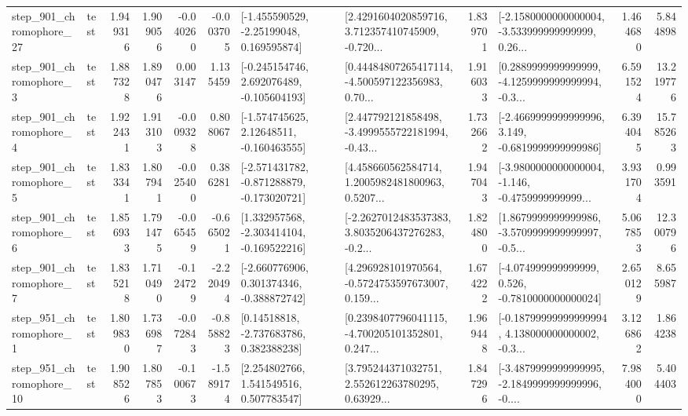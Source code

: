 \begin{tabular}{llrrrrllrlrr}
  step\_901\_chromophore\_27 &      test &      1.949316 &    1.909056 &     -0.040260 & -0.003705 &    [-1.455590529, -2.25199048, 0.169595874] &  [2.4291604020859716, 3.712357410745909, -0.720... &       1.839701 &  [-2.1580000000000004, -3.533999999999999, 0.26... &            1.464680 &          5.844898 \\
   step\_901\_chromophore\_3 &      test &      1.887328 &    1.890476 &      0.003147 &  1.135459 &   [-0.245154746, 2.692076489, -0.105604193] &  [0.44484807265417114, -4.500597122356983, 0.70... &       1.916033 &  [0.2889999999999999, -4.1259999999999994, -0.3... &            6.591524 &         13.219776 \\
   step\_901\_chromophore\_4 &      test &      1.922431 &    1.913103 &     -0.009328 &  0.808067 &    [-1.574745625, 2.12648511, -0.160463555] &  [2.447792121858498, -3.4999555722181994, -0.43... &       1.732662 &  [-2.4669999999999996, 3.149, -0.6819999999999986] &            6.394045 &         15.785263 \\
   step\_901\_chromophore\_5 &      test &      1.833341 &    1.807941 &     -0.025400 &  0.386281 &  [-2.571431782, -0.871288879, -0.173020721] &  [4.458660562584714, 1.2005982481800963, 0.5207... &       1.947043 &  [-3.9800000000000004, -1.146, -0.4759999999999... &            3.931704 &          0.993591 \\
   step\_901\_chromophore\_6 &      test &      1.856933 &    1.791475 &     -0.065459 & -0.665021 &   [1.332957568, -2.303414104, -0.169522216] &  [-2.2627012483537383, 3.8035206437276283, -0.2... &       1.824800 &  [1.8679999999999986, -3.5709999999999997, -0.5... &            5.067853 &         12.300796 \\
   step\_901\_chromophore\_7 &      test &      1.835218 &    1.710490 &     -0.124729 & -2.220494 &   [-2.660776906, 0.301374346, -0.388872742] &  [4.296928101970564, -0.5724753597673007, 0.159... &       1.674222 &   [-4.074999999999999, 0.526, -0.7810000000000024] &            2.650129 &          8.655987 \\
   step\_951\_chromophore\_1 &      test &      1.809830 &    1.736987 &     -0.072843 & -0.858823 &     [0.14518818, -2.737683786, 0.382388238] &  [0.2398407796041115, -4.700205101352801, 0.247... &       1.969448 &  [-0.18799999999999994, 4.138000000000002, -0.3... &            3.126862 &          1.864238 \\
  step\_951\_chromophore\_10 &      test &      1.908526 &    1.807853 &     -0.100673 & -1.589174 &     [2.254802766, 1.541549516, 0.507783547] &  [3.795244371032751, 2.552612263780295, 0.63929... &       1.847296 &  [-3.4879999999999995, -2.1849999999999996, -0.... &            7.984000 &          5.404403 \\

\end{tabular}
